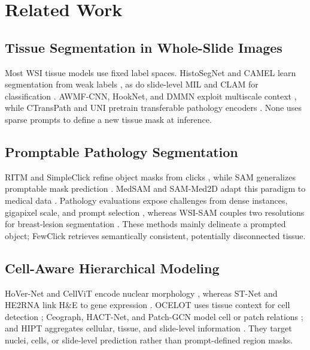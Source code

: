 \documentclass[letterpaper]{article}
\begin{document}
\section{Related Work}
\subsection{Tissue Segmentation in Whole-Slide Images}
Most WSI tissue models use fixed label spaces. HistoSegNet and CAMEL learn segmentation from weak labels \cite{chan2019histosegnet,xu2019camel}, as do slide-level MIL and CLAM for classification \cite{campanella2019clinical,lu2021clam}. AWMF-CNN, HookNet, and DMMN exploit multiscale context \cite{tokunaga2019awmf,vanrijthoven2021hooknet,ho2021dmmn}, while CTransPath and UNI pretrain transferable pathology encoders \cite{wang2022ctranspath,chen2024uni}. None uses sparse prompts to define a new tissue mask at inference.

\subsection{Promptable Pathology Segmentation}
RITM and SimpleClick refine object masks from clicks \cite{sofiiuk2022ritm,liu2023simpleclick}, while SAM generalizes promptable mask prediction \cite{kirillov2023sam}. MedSAM and SAM-Med2D adapt this paradigm to medical data \cite{ma2024medsam,cheng2023sammed2d}. Pathology evaluations expose challenges from dense instances, gigapixel scale, and prompt selection \cite{deng2023sam_pathology}, whereas WSI-SAM couples two resolutions for breast-lesion segmentation \cite{liu2024wsisam}. These methods mainly delineate a prompted object; FewClick retrieves semantically consistent, potentially disconnected tissue.

\subsection{Cell-Aware Hierarchical Modeling}
HoVer-Net and CellViT encode nuclear morphology \cite{graham2019hovernet,horst2024cellvit}, whereas ST-Net and HE2RNA link H\&E to gene expression \cite{he2020stnet,schmauch2020he2rna}. OCELOT uses tissue context for cell detection \cite{ryu2023ocelot}; Ceograph, HACT-Net, and Patch-GCN model cell or patch relations \cite{wang2023ceograph,pati2022hact,chen2021patchgcn}; and HIPT aggregates cellular, tissue, and slide-level information \cite{chen2022hipt}. They target nuclei, cells, or slide-level prediction rather than prompt-defined region masks.
\end{document}
